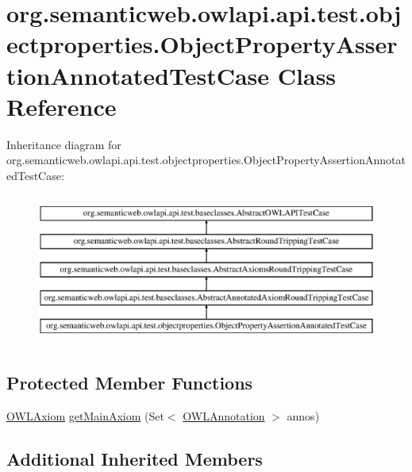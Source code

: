 \hypertarget{classorg_1_1semanticweb_1_1owlapi_1_1api_1_1test_1_1objectproperties_1_1_object_property_assertion_annotated_test_case}{\section{org.\-semanticweb.\-owlapi.\-api.\-test.\-objectproperties.\-Object\-Property\-Assertion\-Annotated\-Test\-Case Class Reference}
\label{classorg_1_1semanticweb_1_1owlapi_1_1api_1_1test_1_1objectproperties_1_1_object_property_assertion_annotated_test_case}
}
Inheritance diagram for org.\-semanticweb.\-owlapi.\-api.\-test.\-objectproperties.\-Object\-Property\-Assertion\-Annotated\-Test\-Case\-:\begin{figure}[H]
\begin{center}
\leavevmode
\includegraphics[height=5.000000cm]{classorg_1_1semanticweb_1_1owlapi_1_1api_1_1test_1_1objectproperties_1_1_object_property_assertion_annotated_test_case}
\end{center}
\end{figure}
\subsection*{Protected Member Functions}
\begin{DoxyCompactItemize}
\item 
\hyperlink{interfaceorg_1_1semanticweb_1_1owlapi_1_1model_1_1_o_w_l_axiom}{O\-W\-L\-Axiom} \hyperlink{classorg_1_1semanticweb_1_1owlapi_1_1api_1_1test_1_1objectproperties_1_1_object_property_assertion_annotated_test_case_a9cf6ed99bfe0ce0b415373b7144efd17}{get\-Main\-Axiom} (Set$<$ \hyperlink{interfaceorg_1_1semanticweb_1_1owlapi_1_1model_1_1_o_w_l_annotation}{O\-W\-L\-Annotation} $>$ annos)
\end{DoxyCompactItemize}
\subsection*{Additional Inherited Members}



